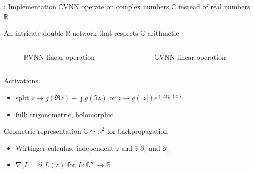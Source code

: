 \documentclass{beamer}
\newcommand{\real}{\mathbb{R}}
\newcommand{\cplx}{\mathbb{C}}
\newcommand{\conj}[1]{\overline{#1}}
\newcommand{\iu}{{\jmath}}
\begin{document}
\begin{frame}[c]{\insertsection: Implementation}
  $\cplx$VNN operate on complex numbers $\cplx$ instead of real numbers $\real$

  \medskip
  An intricate double-$\real$ network that respects $\cplx$-arithmetic
  \vspace{-1em}
  \begin{columns}[T]
    \begin{column}{0.45\linewidth}
      \begin{figure}
          
        {$\real$VNN linear operation}
      \end{figure}
    \end{column}%
    \begin{column}{0.45\linewidth}
      \begin{figure}
          
        {$\cplx$VNN linear operation}
      \end{figure}
    \end{column}
  \end{columns}

  \bigskip
  Activations
  \begin{itemize}
    \item split $
      z \mapsto g(\Re{z}) + \iu g(\Im{z}) %
    $ or $
      z \mapsto g(\lvert z\rvert) e^{\iu \arg{\!(z)}}
    $ %
    \item full: trigonometric, holomorphic
  \end{itemize}

  \smallskip
  Geometric representation $\cplx \simeq \real^2$ for backpropagation
  \begin{itemize}
    \item Wirtinger calculus: independent $z$ and ${\conj{z}}$ $
        \partial_z
      $ and $
        \partial_{\conj{z}}
      $
    \item $\nabla_z L = \partial_{\conj{z}} L(z)$ for $L\colon \cplx^m \to \real$
  \end{itemize}
\end{frame}
\end{document}
